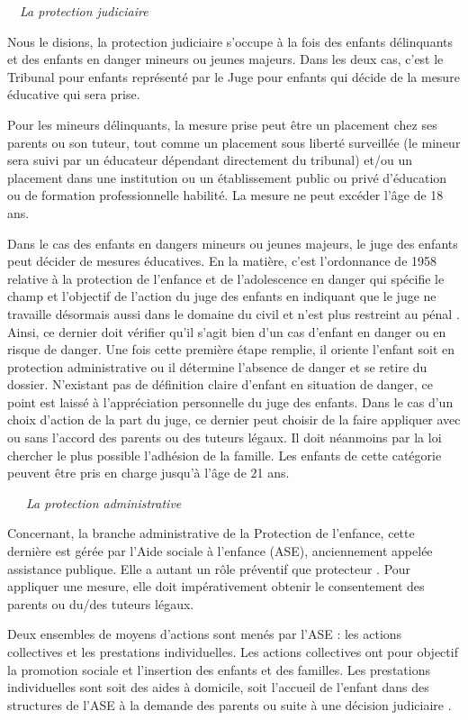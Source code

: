 \documentclass[
  12,
  a4paper,
]{report}
\begin{document}
~~\emph{La protection judiciaire}

Nous le disions, la protection judiciaire s'occupe à la fois des enfants
délinquants et des enfants en danger mineurs ou jeunes majeurs. Dans les
deux cas, c'est le Tribunal pour enfants représenté par le Juge pour
enfants qui décide de la mesure éducative qui sera prise.

Pour les mineurs délinquants, la mesure prise peut être un placement
chez ses parents ou son tuteur, tout comme un placement sous liberté
surveillée (le mineur sera suivi par un éducateur dépendant directement
du tribunal) et/ou un placement dans une institution ou un établissement
public ou privé d'éducation ou de formation professionnelle habilité. La
mesure ne peut excéder l'âge de 18 ans.

Dans le cas des enfants en dangers mineurs ou jeunes majeurs, le juge
des enfants peut décider de mesures éducatives. En la matière, c'est
l'ordonnance de 1958 relative à la protection de l'enfance et de
l'adolescence en danger qui spécifie le champ et l'objectif de l'action
du juge des enfants en indiquant que le juge ne travaille désormais
aussi dans le domaine du civil et n'est plus restreint au pénal . Ainsi,
ce dernier doit vérifier qu'il s'agit bien d'un cas d'enfant en danger
ou en risque de danger. Une fois cette première étape remplie, il
oriente l'enfant soit en protection administrative ou il détermine
l'absence de danger et se retire du dossier. N'existant pas de
définition claire d'enfant en situation de danger, ce point est laissé à
l'appréciation personnelle du juge des enfants. Dans le cas d'un choix
d'action de la part du juge, ce dernier peut choisir de la faire
appliquer avec ou sans l'accord des parents ou des tuteurs légaux. Il
doit néanmoins par la loi chercher le plus possible l'adhésion de la
famille. Les enfants de cette catégorie peuvent être pris en charge
jusqu'à l'âge de 21 ans.

~~~\emph{La protection administrative}

Concernant, la branche administrative de la Protection de l'enfance,
cette dernière est gérée par l'Aide sociale à l'enfance (ASE),
anciennement appelée assistance publique. Elle a autant un rôle
préventif que protecteur . Pour appliquer une mesure, elle doit
impérativement obtenir le consentement des parents ou du/des tuteurs
légaux.

Deux ensembles de moyens d'actions sont menés par l'ASE : les actions
collectives et les prestations individuelles. Les actions collectives
ont pour objectif la promotion sociale et l'insertion des enfants et des
familles. Les prestations individuelles sont soit des aides à domicile,
soit l'accueil de l'enfant dans des structures de l'ASE à la demande des
parents ou suite à une décision judiciaire .
\end{document}
